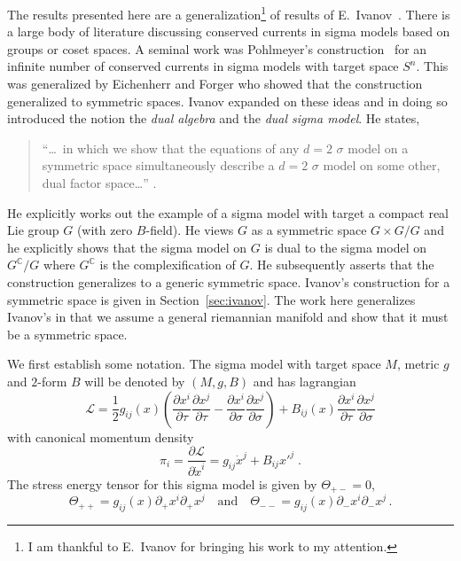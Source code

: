 \documentclass[a4paper,12pt]{article}
\newcommand{\dminus}{\partial_{-}}
\newcommand{\dplus}{\partial_{+}}
\newcommand{\half}{\frac{1}{2}}
\begin{document}
The results presented here are a generalization\footnote{I am thankful
to E.~Ivanov for bringing his work to my attention.} of results of
E.~Ivanov~\cite{Ivanov:1987yv}.  There is a large body of literature
discussing conserved currents in sigma models based on groups or coset
spaces.  A seminal work was Pohlmeyer's
construction~\cite{Pohlmeyer:1975nb} for an infinite number of
conserved currents in sigma models with target space $S^{n}$.  This
was generalized by Eichenherr and Forger
\cite{Eichenherr:1979ci,Eichenherr:1981sk} who showed that the
construction generalized to symmetric spaces.  Ivanov expanded on
these ideas and in doing so introduced the notion the \emph{dual
algebra} and the \emph{dual sigma model}.  He states, 
\begin{quote}
    ``\ldots\ in
    which we show that the equations of any $d=2$ $\sigma$ model on a
    symmetric space simultaneously describe a $d=2$ $\sigma$ model on some
    other, dual factor space\ldots'' \cite[p.  475]{Ivanov:1987yv}.
\end{quote}
He explicitly works out the example of a sigma model with target a
compact real Lie group $G$ (with zero $B$-field).  He views $G$ as a
symmetric space $G\times G/G$ and he explicitly shows that the sigma
model on $G$ is dual to the sigma model on $G^{\mathbb{C}}/G$ where
$G^{\mathbb{C}}$ is the complexification of $G$.  He subsequently
asserts that the construction generalizes to a generic symmetric 
space. Ivanov's construction for a symmetric space is given in 
Section~\ref{sec:ivanov}.  The work here generalizes Ivanov's in that
we assume a general riemannian manifold and show that it must be a
symmetric space.

We first establish some
notation.  The sigma model with target space $M$, metric $g$ and
$2$-form $B$ will be denoted by $(M,g,B)$ and has lagrangian
\begin{equation}
    \mathcal{L} = \half g_{ij}(x)
    \left(
    \frac{\partial x^{i}}{\partial \tau}
    \frac{\partial x^{j}}{\partial \tau}
    -\frac{\partial x^{i}}{\partial \sigma}
    \frac{\partial x^{j}}{\partial \sigma}
    \right) +
    B_{ij}(x)
    \frac{\partial x^{i}}{\partial \tau}
    \frac{\partial x^{j}}{\partial \sigma}
    \label{eq:lag}
\end{equation}
with canonical momentum density
\begin{equation}
    \pi_{i}= \frac{\partial\mathcal{L}}{\partial \dot{x}^{i}} =
    g_{ij}\dot{x}^{j} + B_{ij}x'^{j}\;.
    \label{eq:canmomentum}
\end{equation}
The stress energy tensor for this sigma model is given by
$\Theta_{+-}=0$,
\begin{equation}
    \Theta_{++}= g_{ij}(x) \dplus x^{i} \dplus x^{j} \quad\mbox{and}\quad
    \Theta_{--}= g_{ij}(x) \dminus x^{i} \dminus x^{j}\,.
    \label{eq:Tmunu}
\end{equation}
\end{document}
